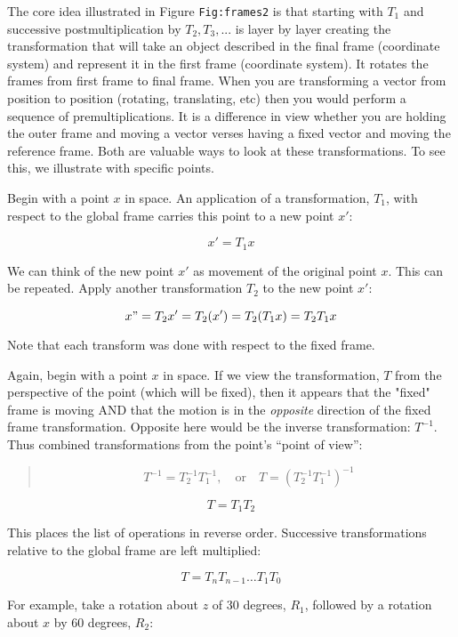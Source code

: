 The core idea illustrated in Figure \texttt{Fig:frames2} is that
starting with \(T_1\) and successive postmultiplication by
\(T_2, T_3, ...\) is layer by layer creating the transformation that
will take an object described in the final frame (coordinate system) and
represent it in the first frame (coordinate system). It rotates the
frames from first frame to final frame. When you are transforming a
vector from position to position (rotating, translating, etc) then you
would perform a sequence of premultiplications. It is a difference in
view whether you are holding the outer frame and moving a vector verses
having a fixed vector and moving the reference frame. Both are valuable
ways to look at these transformations. To see this, we illustrate with
specific points.

Begin with a point \(x\) in space. An application of a transformation,
\(T_1\), with respect to the global frame carries this point to a new
point \(x'\):

\[x' = T_1x\]

We can think of the new point \(x'\) as movement of the original point
\(x\). This can be repeated. Apply another transformation \(T_2\) to the
new point \(x'\):

\[x" = T_2x' = T_2(x') = T_2(T_1x) = T_2T_1x\]

Note that each transform was done with respect to the fixed frame.

Again, begin with a point \(x\) in space. If we view the transformation,
\(T\) from the perspective of the point (which will be fixed), then it
appears that the "fixed" frame is moving AND that the motion is in the
\emph{opposite} direction of the fixed frame transformation. Opposite
here would be the inverse transformation: \(T^{-1}\). Thus combined
transformations from the point's ``point of view'':

\begin{quote}
\[T^{-1} = T_2^{-1}T_1^{-1}, \quad \mbox{or}\quad T = \left(T_2^{-1} T_1^{-1} \right)^{-1}\]
\end{quote}

\[T = T_1T_2\]

This places the list of operations in reverse order. Successive
transformations relative to the global frame are left multiplied:

\[T = T_n T_{n-1} \dots T_1 T_0\]

For example, take a rotation about \(z\) of 30 degrees, \(R_1\),
followed by a rotation about \(x\) by 60 degrees, \(R_2\):

